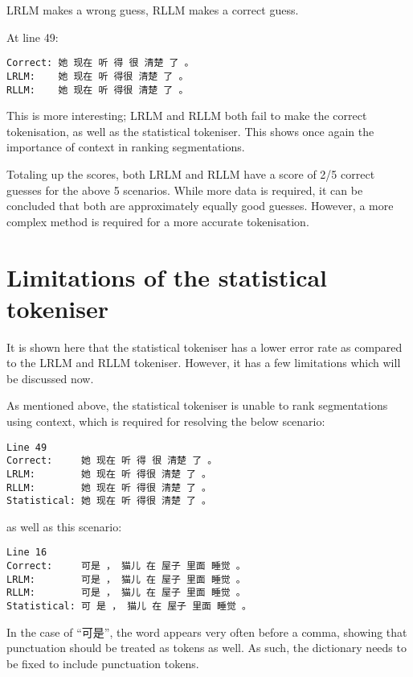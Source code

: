 \documentclass{article}
\begin{document}
LRLM makes a wrong guess, RLLM makes a correct guess.

At line 49:

\begin{verbatim}
Correct: 她 现在 听 得 很 清楚 了 。
LRLM:    她 现在 听 得很 清楚 了 。
RLLM:    她 现在 听 得很 清楚 了 。
\end{verbatim}

This is more interesting; LRLM and RLLM both fail to make the correct
tokenisation, as well as the statistical tokeniser. This shows once
again the importance of context in ranking segmentations.

Totaling up the scores, both LRLM and RLLM have a score of 2/5 correct
guesses for the above 5 scenarios. While more data is required, it can
be concluded that both are approximately equally good guesses. However,
a more complex method is required for a more accurate tokenisation.

\section{Limitations of the statistical tokeniser}

It is shown here that the statistical tokeniser has a lower error rate
as compared to the LRLM and RLLM tokeniser. However, it has a few
limitations which will be discussed now.

As mentioned above, the statistical tokeniser is unable to rank
segmentations using context, which is required for resolving the below
scenario:

\begin{verbatim}
Line 49
Correct:     她 现在 听 得 很 清楚 了 。
LRLM:        她 现在 听 得很 清楚 了 。
RLLM:        她 现在 听 得很 清楚 了 。
Statistical: 她 现在 听 得很 清楚 了 。
\end{verbatim}

as well as this scenario:

\begin{verbatim}
Line 16
Correct:     可是 ， 猫儿 在 屋子 里面 睡觉 。
LRLM:        可是 ， 猫儿 在 屋子 里面 睡觉 。
RLLM:        可是 ， 猫儿 在 屋子 里面 睡觉 。
Statistical: 可 是 ， 猫儿 在 屋子 里面 睡觉 。
\end{verbatim}

In the case of ``可是'', the word appears very often before a comma,
showing that punctuation should be treated as tokens as well. As such,
the dictionary needs to be fixed to include punctuation tokens.
\end{document}
